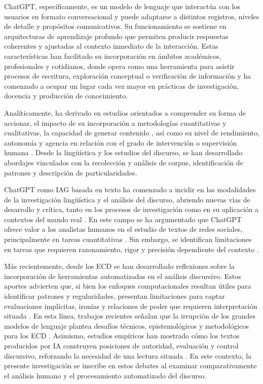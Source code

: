 \documentclass[spanish]{textolivre}
\begin{document}
ChatGPT, específicamente, es un modelo de lenguaje que interactúa con los usuarios en formato conversacional y puede adaptarse a distintos registros, niveles de detalle y propósitos comunicativos. Su funcionamiento se sostiene en arquitecturas de aprendizaje profundo que permiten producir respuestas coherentes y ajustadas al contexto inmediato de la interacción. Estas características han facilitado su incorporación en ámbitos académicos, profesionales y cotidianos, donde opera como una herramienta para asistir procesos de escritura, exploración conceptual o verificación de información y ha comenzado a ocupar un lugar cada vez mayor en prácticas de investigación, docencia y producción de conocimiento.

Analíticamente, ha derivado en estudios orientados a comprender su forma de accionar, el impacto de su incorporación a metodologías cuantitativas y cualitativas, la capacidad de generar contenido \cite{fontjulian2024chatgpt}, así como su nivel de rendimiento, autonomía y agencia en relación con el grado de intervención o supervisión humana \cite{gildezuniga2024scholarly}. Desde la lingüística y los estudios del discurso, se han desarrollado abordajes vinculados con la recolección y análisis de corpus, identificación de patrones y descripción de particularidades.

ChatGPT como IAG basada en texto ha comenzado a incidir en las modalidades de la investigación lingüística y el análisis del discurso, abriendo nuevas vías de desarrollo y crítica, tanto en los procesos de investigación como en su aplicación a contextos del mundo real \cite{curry2024generative,maci2025impact}. En este campo se ha argumentado que ChatGPT ofrece valor a los analistas humanos en el estudio de textos de redes sociales, principalmente en tareas cuantitativas \cite{zappavigna2023hack}. Sin embargo, se identifican limitaciones en tareas que requieren razonamiento, rigor y precisión dependiente del contexto \cite{curry2024generative}.

Más recientemente, desde los ECD se han desarrollado reflexiones sobre la incorporación de herramientas automatizadas en el análisis discursivo. Estos aportes advierten que, si bien los enfoques computacionales resultan útiles para identificar patrones y regularidades, presentan limitaciones para captar evaluaciones implícitas, ironías y relaciones de poder que requieren interpretación situada \cite{khosravinik2020social}. En esta línea, trabajos recientes señalan que la irrupción de los grandes modelos de lenguaje plantea desafíos técnicos, epistemológicos y metodológicos para los ECD \cite{gillings2024rise}. Asimismo, estudios empíricos han mostrado cómo los textos producidos por IA construyen posiciones de autoridad, evaluación y control discursivo, reforzando la necesidad de una lectura situada \cite{ting2025mentor}. En este contexto, la presente investigación se inscribe en estos debates al examinar comparativamente el análisis humano y el procesamiento automatizado del discurso.
\end{document}
